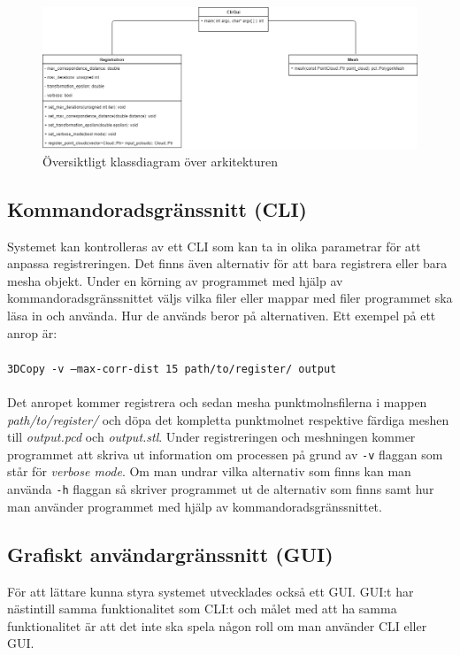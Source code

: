 \begin{figure}[H]
	\centering
	\includegraphics[width=130mm]{figures/klassdiagram.png}
	\caption{Översiktligt klassdiagram över arkitekturen}
	\label{fig:class_diagram}
\end{figure}

\subsection{Kommandoradsgränssnitt (CLI)}

Systemet kan kontrolleras av ett CLI som kan ta in olika parametrar för att anpassa registreringen. Det finns även alternativ för att bara registrera eller bara mesha objekt. Under en körning av programmet med hjälp av kommandoradsgränssnittet väljs vilka filer eller mappar med filer programmet ska läsa in och använda. Hur de används beror på alternativen. Ett exempel på ett anrop är:\\\\
\texttt{3DCopy -v --max-corr-dist 15 path/to/register/ output}\\\\
Det anropet kommer registrera och sedan mesha punktmolnsfilerna i mappen \textit{path/to/register/} och döpa det kompletta punktmolnet respektive färdiga meshen till \textit{output.pcd} och \textit{output.stl}. Under registreringen och meshningen kommer programmet att skriva ut information om processen på grund av \texttt{-v} flaggan som står för \textit{verbose mode}. Om man undrar vilka alternativ som finns kan man använda \texttt{-h} flaggan så skriver programmet ut de alternativ som finns samt hur man använder programmet med hjälp av kommandoradsgränssnittet. 

\subsection{Grafiskt användargränssnitt (GUI)}
För att lättare kunna styra systemet utvecklades också ett GUI. GUI:t har nästintill samma funktionalitet som CLI:t och målet med att ha samma funktionalitet är att det inte ska spela någon roll om man använder CLI eller GUI.

